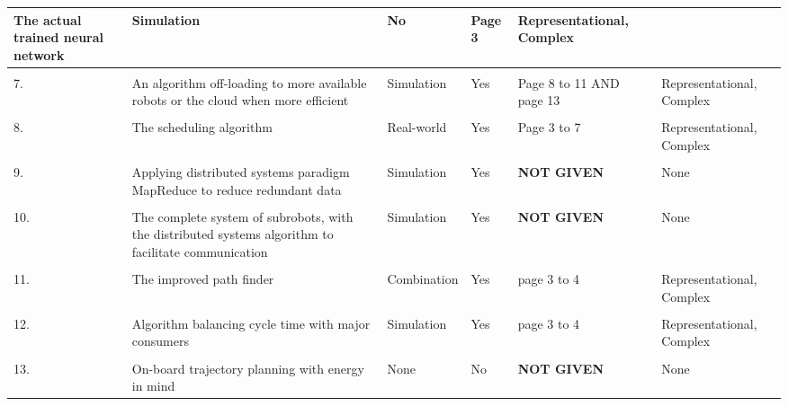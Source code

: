 \begin{table}[h]
\begin{tabular}{p{0.1cm}p{5cm}p{2cm}p{2cm}p{3.5cm}p{3cm}}
                {The actual trained neural network} &
                {Simulation} &
                {No} &
                {Page 3} &
                {Representational, Complex} \\
            \hline
            \\
            {7.} &
                {An algorithm off-loading to more available robots or the cloud when more efficient} &
                {Simulation} &
                {Yes} &
                {Page 8 to 11 AND page 13} &
                {Representational, Complex} \\
            \hline
            \\
            {8.} &
                {The scheduling algorithm} &
                {Real-world} &
                {Yes} &
                {Page 3 to 7} &
                {Representational, Complex} \\
            \hline
            \\
            {9.} &
                {Applying distributed systems paradigm MapReduce to reduce redundant data} &
                {Simulation} &
                {Yes} &
                {\textbf{NOT GIVEN}} &
                {None} \\
            \hline
            \\
            {10.} &
                {The complete system of subrobots, with the distributed systems algorithm to 
                facilitate communication} &
                {Simulation} &
                {Yes} &
                {\textbf{NOT GIVEN}} &
                {None} \\
            \hline
            \\
            {11.} &
                {The improved path finder} &
                {Combination} &
                {Yes} &
                {page 3 to 4} & 
                {Representational, Complex} \\
            \hline
            \\
            {12.} &
                {Algorithm balancing cycle time with major consumers} &
                {Simulation} &
                {Yes} &
                {page 3 to 4} &
                {Representational, Complex} \\
            \hline
            \\
            {13.} &
                {On-board trajectory planning with energy in mind} &
                {None} &
                {No} &
                {\textbf{NOT GIVEN}} &
                {None} \\

\end{tabular}
\end{table}
